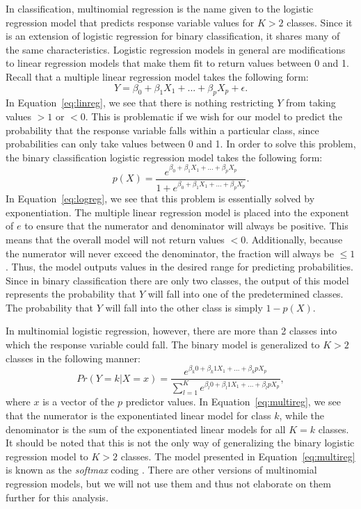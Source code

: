 \documentclass[12pt]{article}
\begin{document}
In classification, multinomial regression is the name given to the 
logistic regression model that predicts response variable values for 
$K > 2$ classes.  Since it is an extension of logistic regression for 
binary classification, it shares many of the same characteristics.  
Logistic regression models in general are modifications to linear 
regression models that make them fit to return values between 0 and 1.  
Recall that a multiple linear regression model takes the following form:
\begin{equation}
  \label{eq:linreg}
  Y = \beta_0 + \beta_1X_1 + ... + \beta_pX_p + \epsilon.
\end{equation}
In Equation~\eqref{eq:linreg}, we see that there is nothing restricting 
$Y$ from taking values $> 1$ or $< 0$.  This is problematic if we wish 
for our model to predict the probability that the response variable 
falls within a particular class, since probabilities can only take 
values between 0 and 1.  In order to solve this problem, the binary 
classification logistic regression model takes the following form:
\begin{equation}
  \label{eq:logreg}
  p(X) = 
  \frac{e ^ {\beta_0 + \beta_1X_1 + ... + \beta_pX_p}} 
  {1 + e ^ {\beta_0 + \beta_1X_1 + ... + \beta_pX_p}}.
\end{equation}
In Equation~\eqref{eq:logreg}, we see that this problem is essentially 
solved by exponentiation.  The multiple linear regression model is 
placed into the exponent of $e$ to ensure that the numerator and 
denominator will always be positive.  This means that the overall 
model will not return values $< 0$.  Additionally, because the numerator 
will never exceed the denominator, the fraction will always be $\leq 1$.  
Thus, the model outputs values in the desired range for predicting probabilities. 
 Since in binary classification there are only two classes, the output of 
 this model represents the probability that $Y$ will fall into one of the 
 predetermined classes.  The probability that $Y$ will fall into the other 
 class is simply $1 - p(X)$.

 In multinomial logistic regression, however, there are more than 2 classes 
 into which the response variable could fall.  The binary model is generalized 
 to $K > 2$ classes in the following manner:
 \begin{equation}
  \label{eq:multireg}
  Pr( Y = k | X = x ) = 
  \frac{e ^ {\beta_k0 + \beta_k1X_1 + ... + \beta_kpX_p}}
  { \sum_{l = 1} ^ {K}  e ^ {\beta_l0 + \beta_l1X_1 + ... + \beta_lpX_p}},
\end{equation}
where $x$ is a vector of the $p$ predictor values.  In 
Equation~\eqref{eq:multireg}, we see that the numerator is the exponentiated 
linear model for class $k$, while the denominator is the sum of the 
exponentiated linear models for all $K = k$ classes.  It should be noted 
that this is not the only way of generalizing the binary logistic regression 
model to $K >2$ classes.  The model presented in Equation~\eqref{eq:multireg} 
is known as the \textit{softmax} coding \citep{james2021introduction}.  
There are other versions of multinomial regression models, but we will not 
use them and thus not elaborate on them further for this analysis.  
\end{document}
